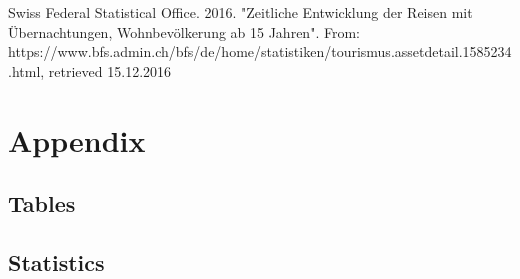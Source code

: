 \documentclass[12pt,a4paper,bibliography=totocnumbered,listof=totocnumbered]{scrartcl}
\begin{document}

Swiss Federal Statistical Office. 2016. "Zeitliche Entwicklung der Reisen mit Übernachtungen, Wohnbevölkerung ab 15 Jahren". From: https://www.bfs.admin.ch/bfs/de/home/statistiken/tourismus.assetdetail.1585234.html, retrieved 15.12.2016

%


%




\section{Appendix}



\subsection{Tables}

\subsection{Statistics}
\end{document}
